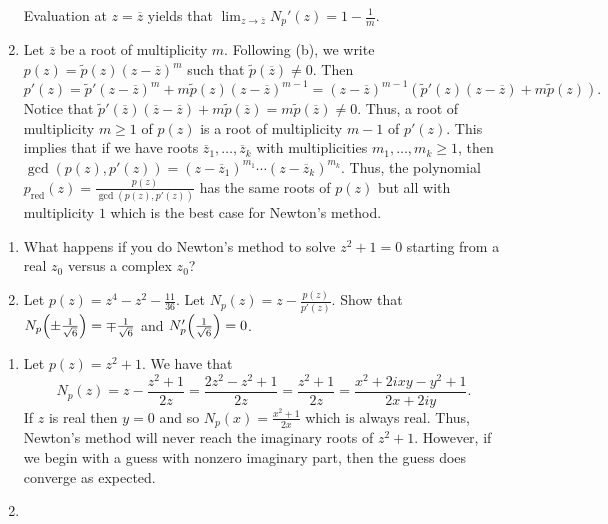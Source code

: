 \documentclass[letterpaper, 11pt, oneside]{book}
\begin{document}
\begin{pf}
\begin{enumerate}[label= (\alph*)]
\[          \]
          Evaluation at $z = \overline{z}$ yields that $\lim_{z \to \overline{z}} N_{p}'(z) = 1 - \frac{1}{m}$.
    \item Let $\overline{z}$ be a root of multiplicity $m$.
          Following (b), we write $p(z) = \tilde{p}(z)(z - \overline{z})^{m}$ such that $\tilde{p}(\overline{z}) \neq 0$.
          Then
          \[
            p'(z) = \tilde{p}'(z - \overline{z})^{m} + m\tilde{p}(z)(z - \overline{z})^{m - 1} = (z - \overline{z})^{m - 1}(\tilde{p}'(z)(z - \overline{z}) + m\tilde{p}(z)).
          \]
          Notice that $\tilde{p}'(\overline{z})(\overline{z} - \overline{z}) + m\tilde{p}(\overline{z}) = m\tilde{p}(\overline{z}) \neq 0$.
          Thus, a root of multiplicity $m \geq 1$ of $p(z)$ is a root of multiplicity $m - 1$ of $p'(z)$.
          This implies that if we have roots $\overline{z}_{1}, \ldots, \overline{z}_{k}$ with multiplicities $m_{1}, \ldots, m_{k} \geq 1$, then $\gcd(p(z), p'(z)) = (z - \overline{z}_{1})^{m_{1}} \cdots (z - \overline{z}_{k})^{m_{k}}$.
          Thus, the polynomial $p_{\mathrm{red}}(z) = \frac{p(z)}{\gcd(p(z), p'(z))}$ has the same roots of $p(z)$ but all with multiplicity $1$ which is the best case for Newton's method.
  \end{enumerate}
\end{pf}

\begin{exercise}\label{ex:UAG_2.1.9}
  \begin{enumerate}[label= (\alph*)]
    \item What happens if you do Newton's method to solve $z^{2} + 1 = 0$ starting from a real $z_{0}$ versus a complex $z_{0}$?
    \item Let $p(z) = z^{4} - z^{2} - \frac{11}{36}$.
          Let $N_{p}(z) = z - \frac{p(z)}{p'(z)}$.
          Show that $N_{p}\pqty{\pm\frac{1}{\sqrt{6}}} = \mp \frac{1}{\sqrt{6}}$ and $N_{p}'\pqty{\frac{1}{\sqrt{6}}} = 0$.
  \end{enumerate}
\end{exercise}
\begin{pf}
  \begin{enumerate}[label= (\alph*)]
    \item Let $p(z) = z^{2} + 1$.
          We have that
          \[
            N_{p}(z) = z - \frac{z^{2} + 1}{2z} = \frac{2z^{2} - z^{2} + 1}{2z} = \frac{z^{2} + 1}{2z} = \frac{x^{2} + 2ixy - y^{2} + 1}{2x + 2iy}.
          \]
          If $z$ is real then $y = 0$ and so $N_{p}(x) = \frac{x^{2} + 1}{2x}$ which is always real.
          Thus, Newton's method will never reach the imaginary roots of $z^{2} + 1$.
          However, if we begin with a guess with nonzero imaginary part, then the guess does converge as expected.
    \item {}
  \end{enumerate}
\end{pf}
\end{document}
